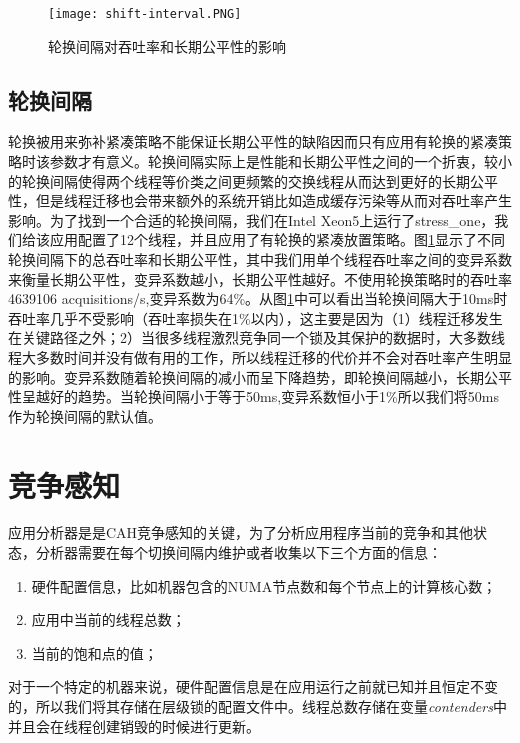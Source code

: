 \begin{figure}[t]
	\centering
	\texttt{[image: shift-interval.PNG]}
	\caption{轮换间隔对吞吐率和长期公平性的影响}
	\label{Fig:shift-interval}
\end{figure}

\subsection{轮换间隔}
轮换被用来弥补紧凑策略不能保证长期公平性的缺陷因而只有应用有轮换的紧凑策略时该参数才有意义。轮换间隔实际上是性能和长期公平性之间的一个折衷，较小的轮换间隔使得两个线程等价类之间更频繁的交换线程从而达到更好的长期公平性，但是线程迁移也会带来额外的系统开销比如造成缓存污染等从而对吞吐率产生影响。为了找到一个合适的轮换间隔，我们在Intel Xeon5上运行了stress\_one，我们给该应用配置了12个线程，并且应用了有轮换的紧凑放置策略。图\ref{Fig:shift-interval}显示了不同轮换间隔下的总吞吐率和长期公平性，其中我们用单个线程吞吐率之间的变异系数来衡量长期公平性，变异系数越小，长期公平性越好。不使用轮换策略时的吞吐率4639106 acquisitions/s,变异系数为64\%。从图\ref{Fig:shift-interval}中可以看出当轮换间隔大于10ms时吞吐率几乎不受影响（吞吐率损失在1\%以内），这主要是因为（1）线程迁移发生在关键路径之外；2）当很多线程激烈竞争同一个锁及其保护的数据时，大多数线程大多数时间并没有做有用的工作，所以线程迁移的代价并不会对吞吐率产生明显的影响。变异系数随着轮换间隔的减小而呈下降趋势，即轮换间隔越小，长期公平性呈越好的趋势。当轮换间隔小于等于50ms,变异系数恒小于1\%所以我们将50ms作为轮换间隔的默认值。

\section{竞争感知}
应用分析器是是CAH竞争感知的关键，为了分析应用程序当前的竞争和其他状态，分析器需要在每个切换间隔内维护或者收集以下三个方面的信息：
\begin{enumerate}
  \item 硬件配置信息，比如机器包含的NUMA节点数和每个节点上的计算核心数；
  \item 应用中当前的线程总数；
  \item 当前的饱和点的值；
\end{enumerate}
对于一个特定的机器来说，硬件配置信息是在应用运行之前就已知并且恒定不变的，所以我们将其存储在层级锁的配置文件中。线程总数存储在变量\emph{contenders}中并且会在线程创建销毁的时候进行更新。

